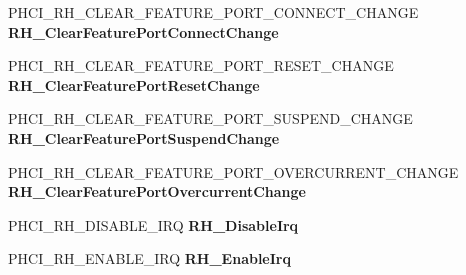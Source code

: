 \begin{DoxyCompactItemize}
\item 
\mbox{\label{struct___u_s_b_p_o_r_t___r_e_g_i_s_t_r_a_t_i_o_n___p_a_c_k_e_t_ae0660b6cc7ff18588e81a2400a32d08b}} 
P\+H\+C\+I\+\_\+\+R\+H\+\_\+\+C\+L\+E\+A\+R\+\_\+\+F\+E\+A\+T\+U\+R\+E\+\_\+\+P\+O\+R\+T\+\_\+\+C\+O\+N\+N\+E\+C\+T\+\_\+\+C\+H\+A\+N\+GE {\bfseries R\+H\+\_\+\+Clear\+Feature\+Port\+Connect\+Change}
\item 
\mbox{\label{struct___u_s_b_p_o_r_t___r_e_g_i_s_t_r_a_t_i_o_n___p_a_c_k_e_t_a61a59f6ed8f74f1f706f63cc5245bc7e}} 
P\+H\+C\+I\+\_\+\+R\+H\+\_\+\+C\+L\+E\+A\+R\+\_\+\+F\+E\+A\+T\+U\+R\+E\+\_\+\+P\+O\+R\+T\+\_\+\+R\+E\+S\+E\+T\+\_\+\+C\+H\+A\+N\+GE {\bfseries R\+H\+\_\+\+Clear\+Feature\+Port\+Reset\+Change}
\item 
\mbox{\label{struct___u_s_b_p_o_r_t___r_e_g_i_s_t_r_a_t_i_o_n___p_a_c_k_e_t_ac0365066aefda41e86ec39e4c13b9946}} 
P\+H\+C\+I\+\_\+\+R\+H\+\_\+\+C\+L\+E\+A\+R\+\_\+\+F\+E\+A\+T\+U\+R\+E\+\_\+\+P\+O\+R\+T\+\_\+\+S\+U\+S\+P\+E\+N\+D\+\_\+\+C\+H\+A\+N\+GE {\bfseries R\+H\+\_\+\+Clear\+Feature\+Port\+Suspend\+Change}
\item 
\mbox{\label{struct___u_s_b_p_o_r_t___r_e_g_i_s_t_r_a_t_i_o_n___p_a_c_k_e_t_a301f832b2dda82ffe8f3ab16487c44c5}} 
P\+H\+C\+I\+\_\+\+R\+H\+\_\+\+C\+L\+E\+A\+R\+\_\+\+F\+E\+A\+T\+U\+R\+E\+\_\+\+P\+O\+R\+T\+\_\+\+O\+V\+E\+R\+C\+U\+R\+R\+E\+N\+T\+\_\+\+C\+H\+A\+N\+GE {\bfseries R\+H\+\_\+\+Clear\+Feature\+Port\+Overcurrent\+Change}
\item 
\mbox{\label{struct___u_s_b_p_o_r_t___r_e_g_i_s_t_r_a_t_i_o_n___p_a_c_k_e_t_a41bbeb31a5bc48c2c4168475a73290d4}} 
P\+H\+C\+I\+\_\+\+R\+H\+\_\+\+D\+I\+S\+A\+B\+L\+E\+\_\+\+I\+RQ {\bfseries R\+H\+\_\+\+Disable\+Irq}
\item 
\mbox{\label{struct___u_s_b_p_o_r_t___r_e_g_i_s_t_r_a_t_i_o_n___p_a_c_k_e_t_a222f5654dad39f0c60411fe2731750c1}} 
P\+H\+C\+I\+\_\+\+R\+H\+\_\+\+E\+N\+A\+B\+L\+E\+\_\+\+I\+RQ {\bfseries R\+H\+\_\+\+Enable\+Irq}

\end{DoxyCompactItemize}

